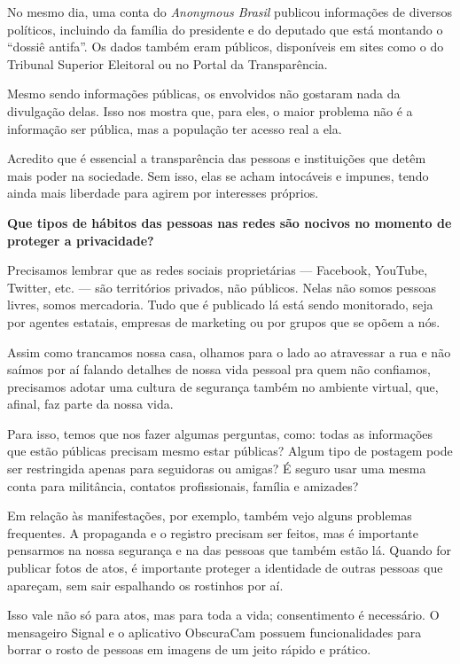 No mesmo dia, uma conta do \emph{Anonymous Brasil} publicou informações de
diversos políticos, incluindo da família do presidente e do deputado que
está montando o ``dossiê antifa''. Os dados também eram públicos,
disponíveis em sites como o do Tribunal Superior Eleitoral ou no Portal
da Transparência.

Mesmo sendo informações públicas, os envolvidos não gostaram nada da
divulgação delas. Isso nos mostra que, para eles, o maior problema não é
a informação ser pública, mas a população ter acesso real a ela.

Acredito que é essencial a transparência das pessoas e instituições que
detêm mais poder na sociedade. Sem isso, elas se acham intocáveis e
impunes, tendo ainda mais liberdade para agirem por interesses próprios.

\bigskip

\noindent{}\textbf{Que tipos de hábitos das pessoas nas redes são nocivos no
momento de proteger a privacidade? }

Precisamos lembrar que as redes sociais
proprietárias --- Facebook, YouTube, Twitter, etc. --- são territórios
privados, não públicos. Nelas não somos pessoas livres, somos mercadoria.
Tudo que é publicado lá está sendo monitorado, seja por agentes
estatais, empresas de marketing ou por grupos que se opõem a nós.

Assim como trancamos nossa casa, olhamos para o lado ao atravessar a rua
e não saímos por aí falando detalhes de nossa vida pessoal pra quem não
confiamos, precisamos adotar uma cultura de segurança também no ambiente
virtual, que, afinal, faz parte da nossa vida.

Para isso, temos que nos fazer algumas perguntas, como: todas as
informações que estão públicas precisam mesmo estar públicas? Algum tipo
de postagem pode ser restringida apenas para seguidoras ou amigas? É
seguro usar uma mesma conta para militância, contatos profissionais,
família e amizades?

Em relação às manifestações, por exemplo, também vejo alguns problemas
frequentes. A propaganda e o registro precisam ser feitos, mas é
importante pensarmos na nossa segurança e na das pessoas que também
estão lá. Quando for publicar fotos de atos, é importante proteger a
identidade de outras pessoas que apareçam, sem sair espalhando os
rostinhos por aí.

Isso vale não só para atos, mas para toda a vida; consentimento é
necessário. O mensageiro Signal e
o aplicativo
ObscuraCam possuem funcionalidades para borrar o rosto de pessoas em imagens de
um jeito rápido e prático.

